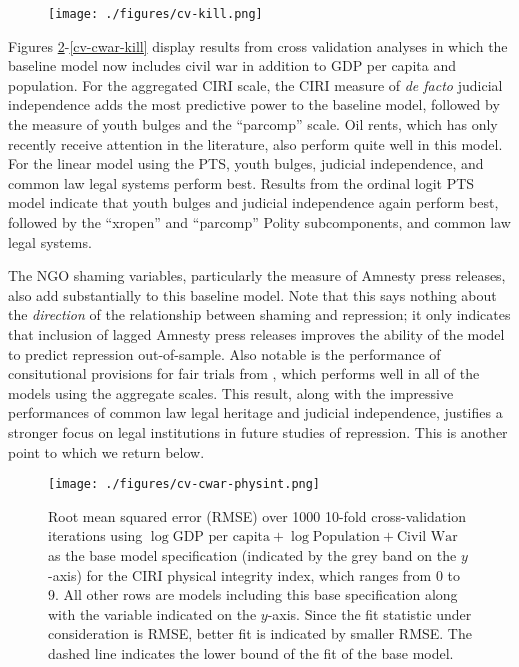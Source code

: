 \documentclass[12pt]{article}
\begin{document}
\begin{figure}[!htpb]
\centering
\texttt{[image: ./figures/cv-kill.png]}
\caption{}
\label{cv-kill}
\end{figure}

Figures \ref{cv-cwar-physint}-\ref{cv-cwar-kill} display results from cross validation analyses in which the baseline model now includes civil war in addition to GDP per capita and population. For the aggregated CIRI scale, the CIRI measure of {\it de facto} judicial independence adds the most predictive power to the baseline model, followed by the measure of youth bulges and the ``parcomp'' scale. Oil rents, which has only recently receive attention in the literature, also perform quite well in this model. For the linear model using the PTS, youth bulges, judicial independence, and common law legal systems perform best. Results from the ordinal logit PTS model indicate that youth bulges and judicial independence again perform best, followed by the ``xropen'' and ``parcomp'' Polity subcomponents, and common law legal systems. 

The NGO shaming variables, particularly the measure of Amnesty press releases, also add substantially to this baseline model. Note that this says nothing about the {\it direction} of the relationship between shaming and repression; it only indicates that inclusion of lagged Amnesty press releases improves the ability of the model to predict repression out-of-sample. Also notable is the performance of consitutional provisions for fair trials from \citet{KeithTatePoe2009}, which performs well in all of the models using the aggregate scales. This result, along with the impressive performances of common law legal heritage and judicial independence, justifies a stronger focus on legal institutions in future studies of repression. This is another point to which we return below. 

\begin{figure}[!htpb]
\centering
\texttt{[image: ./figures/cv-cwar-physint.png]}
\caption{Root mean squared error (RMSE) over 1000 10-fold cross-validation iterations using $\log \text{GDP per capita} + \log \text{Population} + \text{Civil War}$ as the base model specification (indicated by the grey band on the $y$-axis) for the CIRI physical integrity index, which ranges from 0 to 9. All other rows are models including this base specification along with the variable indicated on the $y$-axis. Since the fit statistic under consideration is RMSE, better fit is indicated by smaller RMSE. The dashed line indicates the lower bound of the fit of the base model.}
\caption{}
\label{cv-cwar-physint}
\end{figure}
\end{document}
